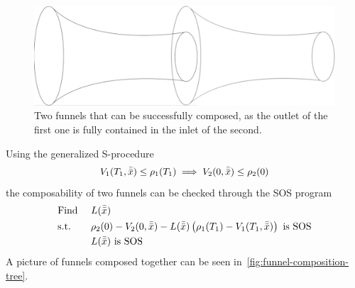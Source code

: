 \begin{figure}
  \centering \includegraphics[scale=.2]{figures/method/funnel-composition}
  \caption{Two funnels that can be successfully composed, as the outlet of the
    first one is fully contained in the inlet of the second.}
  \label{fig:two-funnels-composed}
\end{figure}

Using the generalized S-procedure
\begin{equation}
  V_1(T_1,\bar{\bar{x}}) \leq \rho_1(T_1) \implies V_2(0, \bar{\bar{x}}) \leq \rho_2(0)
\end{equation}
the composability of two funnels can be checked through the \ac{SOS} program
\begin{align}
  & \text{Find } && L(\bar{\bar{x}}) \\
  & \text{s.t. } && \rho_2(0) - V_2(0,\bar{\bar{x}}) - L(\bar{\bar{x}})\left( \rho_1(T_1) - V_1(T_1,\bar{\bar{x}}) \right) \text{ is SOS} \nonumber \\ 
  &&& L(\bar{\bar{x}}) \text{ is SOS} \nonumber
\end{align}
A picture of funnels composed together can be seen
in~\cref{fig:funnel-composition-tree}.
